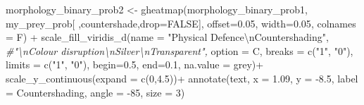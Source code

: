 \documentclass[
]{article}
\newenvironment{Shaded}{\begin{snugshade}}{\end{snugshade}}
\newcommand{\AttributeTok}[1]{\textcolor[rgb]{0.77,0.63,0.00}{#1}}
\newcommand{\CommentTok}[1]{\textcolor[rgb]{0.56,0.35,0.01}{\textit{#1}}}
\newcommand{\ConstantTok}[1]{\textcolor[rgb]{0.00,0.00,0.00}{#1}}
\newcommand{\DecValTok}[1]{\textcolor[rgb]{0.00,0.00,0.81}{#1}}
\newcommand{\FloatTok}[1]{\textcolor[rgb]{0.00,0.00,0.81}{#1}}
\newcommand{\FunctionTok}[1]{\textcolor[rgb]{0.00,0.00,0.00}{#1}}
\newcommand{\NormalTok}[1]{#1}
\newcommand{\OtherTok}[1]{\textcolor[rgb]{0.56,0.35,0.01}{#1}}
\newcommand{\SpecialCharTok}[1]{\textcolor[rgb]{0.00,0.00,0.00}{#1}}
\newcommand{\StringTok}[1]{\textcolor[rgb]{0.31,0.60,0.02}{#1}}
\begin{document}
\begin{Shaded}
\begin{Highlighting}[]
\NormalTok{morphology\_binary\_prob2 }\OtherTok{\textless{}{-}} \FunctionTok{gheatmap}\NormalTok{(morphology\_binary\_prob1, my\_prey\_prob[ ,}\StringTok{\textquotesingle{}countershade\textquotesingle{}}\NormalTok{,}\AttributeTok{drop=}\ConstantTok{FALSE}\NormalTok{], }
                                    \AttributeTok{offset=}\FloatTok{0.05}\NormalTok{, }\AttributeTok{width=}\FloatTok{0.05}\NormalTok{, }\AttributeTok{colnames =}\NormalTok{ F) }\SpecialCharTok{+}
  \FunctionTok{scale\_fill\_viridis\_d}\NormalTok{(}\AttributeTok{name =} \StringTok{"Physical Defence}\SpecialCharTok{\textbackslash{}n}\StringTok{Countershading"}\NormalTok{, }\CommentTok{\#"\textbackslash{}nColour disruption\textbackslash{}nSilver\textbackslash{}nTransparent", }
                       \AttributeTok{option =} \StringTok{\textquotesingle{}C\textquotesingle{}}\NormalTok{,}
                       \AttributeTok{breaks =} \FunctionTok{c}\NormalTok{(}\StringTok{"1"}\NormalTok{, }\StringTok{"0"}\NormalTok{),}
                       \AttributeTok{limits =} \FunctionTok{c}\NormalTok{(}\StringTok{"1"}\NormalTok{, }\StringTok{"0"}\NormalTok{),}
                       \AttributeTok{begin=}\FloatTok{0.5}\NormalTok{, }\AttributeTok{end=}\FloatTok{0.1}\NormalTok{, }
                       \AttributeTok{na.value =} \StringTok{\textquotesingle{}grey\textquotesingle{}}\NormalTok{)}\SpecialCharTok{+}
  \FunctionTok{scale\_y\_continuous}\NormalTok{(}\AttributeTok{expand =} \FunctionTok{c}\NormalTok{(}\DecValTok{0}\NormalTok{,}\FloatTok{4.5}\NormalTok{))}\SpecialCharTok{+}
  \FunctionTok{annotate}\NormalTok{(}\StringTok{\textquotesingle{}text\textquotesingle{}}\NormalTok{, }\AttributeTok{x =} \FloatTok{1.09}\NormalTok{, }\AttributeTok{y =} \SpecialCharTok{{-}}\FloatTok{8.5}\NormalTok{, }\AttributeTok{label =} \StringTok{\textquotesingle{}Countershading\textquotesingle{}}\NormalTok{, }\AttributeTok{angle =} \SpecialCharTok{{-}}\DecValTok{85}\NormalTok{, }\AttributeTok{size =} \DecValTok{3}\NormalTok{)}


\end{Highlighting}
\end{Shaded}
\end{document}

